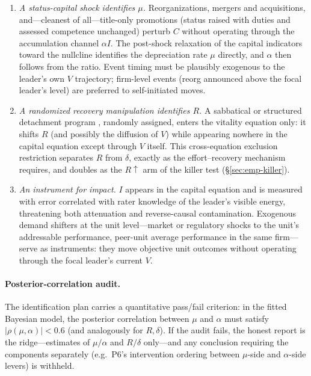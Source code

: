 \begin{enumerate}
\item \emph{A status-capital shock identifies $\mu$.} Reorganizations,
mergers and acquisitions, and---cleanest of all---title-only promotions
(status raised with duties and assessed competence unchanged) perturb $C$
without operating through the accumulation channel $\alpha I$. The
post-shock relaxation of the capital indicators toward the nullcline
identifies the depreciation rate $\mu$ directly, and $\alpha$ then follows
from the ratio. Event timing must be plausibly exogenous to the leader's
own $V$ trajectory; firm-level events (reorg announced above the focal
leader's level) are preferred to self-initiated moves.
\item \emph{A randomized recovery manipulation identifies $R$.} A
sabbatical or structured detachment program
\citep{davidson2010sabbatical,sonnentag2022recovery}, randomly assigned,
enters the vitality equation only: it shifts $R$ (and possibly the
diffusion of $V$) while appearing nowhere in the capital equation except
through $V$ itself. This cross-equation exclusion restriction separates
$R$ from $\delta$, exactly as the effort--recovery mechanism
\citep{meijman1998effort} requires, and doubles as the $R\uparrow$ arm of
the killer test (\S\ref{sec:emp-killer}).
\item \emph{An instrument for impact.} $I$ appears in the capital equation
and is measured with error correlated with rater knowledge of the
leader's visible energy, threatening both attenuation and reverse-causal
contamination. Exogenous demand shifters at the unit level---market or
regulatory shocks to the unit's addressable performance, peer-unit
average performance in the same firm---serve as instruments: they move
objective unit outcomes without operating through the focal leader's
current $V$.
\end{enumerate}

\paragraph{Posterior-correlation audit.}
The identification plan carries a quantitative pass/fail criterion: in the
fitted Bayesian model, the posterior correlation between $\mu$ and $\alpha$
must satisfy $|\rho(\mu,\alpha)|<0.6$ (and analogously for $R,\delta$).
If the audit fails, the honest report is the ridge---estimates of
$\mu/\alpha$ and $R/\delta$ only---and any conclusion requiring the
components separately (e.g.\ P6's intervention ordering between
$\mu$-side and $\alpha$-side levers) is withheld.

